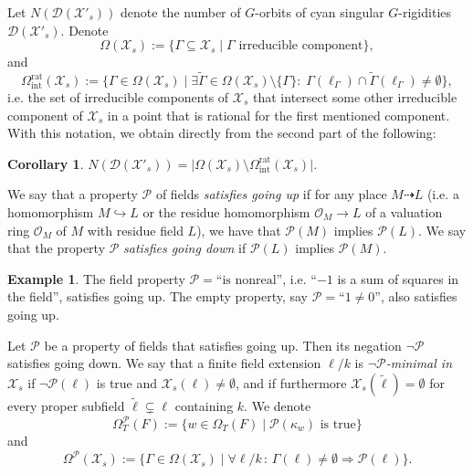 \documentclass[a4paper,12pt,reqno]{amsart}
\newcommand\mc\mathcal
\newcommand{\wt}{\widetilde}
\newtheorem{cor}[thm]{Corollary}
\theoremstyle{definition}
\newtheorem{ex}[thm]{Example}
\numberwithin{equation}{thm}
\begin{document}
Let  $N(\mc{D}(\mc{X}'_s))$ denote the number of $G$-orbits of cyan singular $G$-rigidities $\mc{D}(\mc{X}'_s)$.
Denote 
$$\Omega(\mc{X}_s):=\{\Gamma \subseteq \mc{X}_s \mid \Gamma \text{ irreducible component}\},$$
and $$\Omega^{\mathrm{rat}}_{\mathrm{int}}(\mc{X}_s):=\{\Gamma \in \Omega(\mc{X}_s) \mid \exists \widetilde{\Gamma}\in \Omega(\mc{X}_s)\setminus\{\Gamma\}: \;  \Gamma(\ell_\Gamma) \cap \widetilde{\Gamma}(\ell_\Gamma)\neq \emptyset \},$$
i.e. the set of irreducible components of $\mc{X}_s$ that intersect some other irreducible component of $\mc{X}_s$ in a point that is rational for the first mentioned component. With this notation, we obtain directly from the second part of  the following: 
 
\begin{cor}\label{cyan vorteces are nonrats}
    $N(\mc{D}(\mc{X}'_s))=\vert \Omega(\mc{X}_s) \setminus \Omega^{\mathrm{rat}}_{\mathrm{int}}(\mc{X}_s)\vert$.
\end{cor}

We say that a property $\mathcal{P}$ of fields  \textit{satisfies going up} if for any place $M \dashrightarrow L$ (i.e. a homomorphism $M \hookrightarrow L$ or the residue homomorphism $\mathcal{O}_M \to L$ of a valuation ring $\mathcal{O}_M$ of $M$ with residue field $L$), we have that $\mathcal{P}(M)$ implies $\mathcal{P}(L)$.
We say that the property $\mathcal{P}$ \textit{satisfies going down} if $\mathcal{P}(L)$ implies $\mathcal{P}(M)$. 

\begin{ex} The field property $\mathcal{P}=\text{``is nonreal''}$, i.e. ``$-1$ is a sum of squares in the field'', satisfies going up.
The empty property, say $\mathcal{P}=\text{``$1\neq 0$''}$, also satisfies going up.
\end{ex}


Let $\mathcal{P}$ be a property of fields that satisfies going up. Then its negation $\neg \mathcal{P}$ satisfies going down.
We say that a finite field extension $\ell/k$  is \textit{$\neg \mathcal{P}$-minimal in $\mc{X}_s$} if $\neg\mathcal{P}(\ell)$ is true and $\mc{X}_s(\ell)\neq \emptyset$, and if furthermore $\mc{X}_s(\wt{\ell})= \emptyset$ for every proper subfield $\wt{\ell} \subsetneq \ell$ containing $k$.
We denote 
$$\Omega^{\mathcal{P}}_T(F):=\{ w \in \Omega_T(F) \mid \mathcal{P}(\kappa_w)  \text{ is true}\}$$
and
$$\Omega^{\mathcal{P}}(\mc{X}_s):=\{ \Gamma \in \Omega(\mc{X}_s) \mid  \forall \ell/k \, :  \,  \Gamma(\ell)\neq \emptyset \Rightarrow \mathcal{P}(\ell)\}.$$
\end{document}
